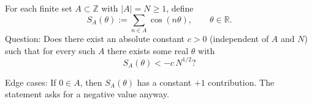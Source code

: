 For each finite set $A\subset\mathbb{Z}$ with $|A|=N\ge 1$, define
\[
S_A(\theta):=\sum_{n\in A}\cos(n\theta),\qquad \theta\in\mathbb{R}.
\]
Question: Does there exist an absolute constant $c>0$ (independent of $A$ and $N$) such that for every such $A$ there exists some real $\theta$ with
\[
S_A(\theta) < -c\,N^{1/2}?
\]

Edge cases: If $0\in A$, then $S_A(\theta)$ has a constant $+1$ contribution. The statement asks for a negative value anyway.

